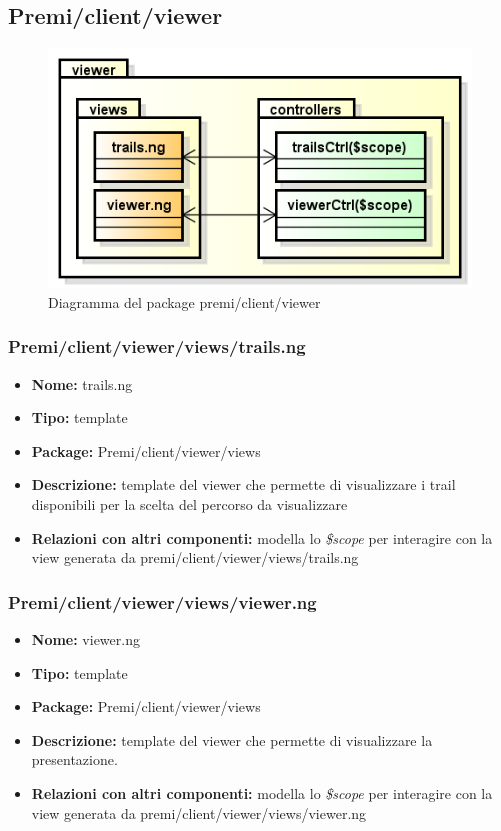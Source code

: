 \subsection{Premi/client/viewer}
\begin{figure}[!h]
\begin{center}
\includegraphics[scale=0.45]{img/diapkg/viewer.png}
\caption{Diagramma del package premi/client/viewer}
\end{center}
\end{figure}
\subsubsection{Premi/client/viewer/views/trails.ng}
\begin{itemize}
  \item[] \textbf{Nome:} trails.ng
  \item[] \textbf{Tipo:} template
  \item[] \textbf{Package:} Premi/client/viewer/views
  \item[] \textbf{Descrizione:} template del viewer che permette di visualizzare i trail disponibili per la scelta del percorso da visualizzare
  \item[] \textbf{Relazioni con altri componenti:} modella lo \textit{\$scope} per interagire con la view generata da premi/client/viewer/views/trails.ng
\end{itemize}
\subsubsection{Premi/client/viewer/views/viewer.ng}
\begin{itemize}
  \item[] \textbf{Nome:} viewer.ng
  \item[] \textbf{Tipo:} template
  \item[] \textbf{Package:} Premi/client/viewer/views
  \item[] \textbf{Descrizione:} template del viewer che permette di visualizzare la presentazione.
  \item[] \textbf{Relazioni con altri componenti:} modella lo \textit{\$scope} per interagire con la view generata da premi/client/viewer/views/viewer.ng
\end{itemize}
